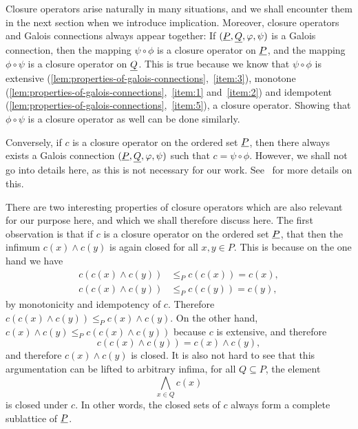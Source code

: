Closure operators arise naturally in many situations, and we shall encounter them in the
next section when we introduce implication.  Moreover, closure operators and Galois
connections always appear together: If $({\underline{P}}, {\underline{Q}}, \varphi, \psi)$ is a Galois
connection, then the mapping $\psi \circ \phi$ is a closure operator on ${\underline{P}}$, and the
mapping $\phi \circ \psi$ is a closure operator on ${\underline{Q}}$.  This is true because we know
that $\psi \circ \phi$ is extensive
(\ref{lem:properties-of-galois-connections},~\ref{item:3}), monotone
(\ref{lem:properties-of-galois-connections},~\ref{item:1} and~\ref{item:2}) and idempotent
(\ref{lem:properties-of-galois-connections},~\ref{item:5}), \ie a closure operator.
Showing that $\phi \circ \psi$ is a closure operator as well can be done similarly.

Conversely, if $c$ is a closure operator on the ordered set ${\underline{P}}$, then there always
exists a Galois connection $({\underline{P}}, {\underline{Q}}, \varphi, \psi)$ such that $c = \psi \circ \phi$.
However, we shall not go into details here, as this is not necessary for our work.
See~\cite{fca-book} for more details on this.

There are two interesting properties of closure operators which are also relevant for our
purpose here, and which we shall therefore discuss here.  The first observation is that if
$c$ is a closure operator on the ordered set ${\underline{P}}$, that then the infimum $c(x) \wedge
c(y)$ is again closed for all $x, y \in P$.  This is because on the one hand we have
\begin{align*}
  c(c(x) \wedge c(y)) &\leq_P c(c(x)) = c(x),\\
  c(c(x) \wedge c(y)) &\leq_P c(c(y)) = c(y),
\end{align*}
by monotonicity and idempotency of $c$.  Therefore $c(c(x) \wedge c(y)) \leq_P c(x) \wedge
c(y)$.  On the other hand, $c(x) \wedge c(y) \leq_P c(c(x) \wedge c(y))$ because $c$ is
extensive, and therefore
\begin{equation}
  \label{eq:13}
  c(c(x) \wedge c(y)) = c(x) \wedge c(y),
\end{equation}
and therefore $c(x) \wedge c(y)$ is closed.  It is also not hard to see that this
argumentation can be lifted to arbitrary infima, \ie for all $Q \subseteq P$, the element
\begin{equation*}
  \bigwedge_{x \in Q} c(x)
\end{equation*}
is closed under $c$.  In other words, the closed sets of $c$ always form a complete
sublattice of ${\underline{P}}$.

